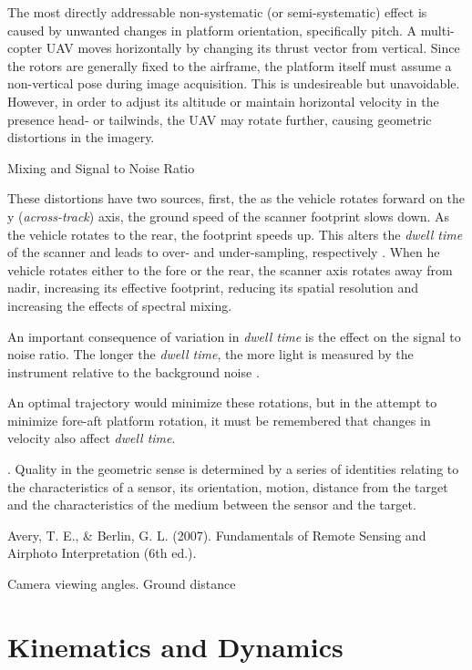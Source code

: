 \documentclass[10pt]{article}
\begin{document}
The most directly addressable non-systematic (or semi-systematic) effect is caused by unwanted changes in platform orientation, specifically pitch. A multi-copter UAV moves horizontally by changing its thrust vector from vertical. Since the rotors are generally fixed to the airframe, the platform itself must assume a non-vertical pose during image acquisition. This is undesireable but unavoidable. However, in order to adjust its altitude or maintain horizontal velocity in the presence head- or tailwinds, the UAV may rotate further, causing geometric distortions in the imagery. 

Mixing and Signal to Noise Ratio

These distortions have two sources, first, the as the vehicle rotates forward on the y (\emph{across-track}) axis, the ground speed of the scanner footprint slows down. As the vehicle rotates to the rear, the footprint speeds up. This alters the \emph{dwell time} of the scanner and leads to over- and under-sampling, respectively \cite{Gupta2018}. When he vehicle rotates either to the fore or the rear, the scanner axis rotates away from nadir, increasing its effective footprint, reducing its spatial resolution \cite{Gupta2018} and increasing the effects of spectral mixing. 

An important consequence of variation in \emph{dwell time} is the effect on the signal to noise ratio. The longer the \emph{dwell time}, the more light is measured by the instrument relative to the background noise \cite{Rogass2014}.

An optimal trajectory would minimize these rotations, but in the attempt to minimize fore-aft platform rotation, it must be remembered that changes in velocity also affect \emph{dwell time}.




 \cite{Gupta2018}. 
Quality in the geometric sense is determined by a series of identities relating to the characteristics of a sensor, its orientation, motion, distance from the target and the characteristics of the medium between the sensor and the target.

\cite{Avery2007}
Avery, T. E., \& Berlin, G. L. (2007). Fundamentals of Remote Sensing and Airphoto Interpretation (6th ed.).

Camera viewing angles.
Ground distance


\section{Kinematics and Dynamics}
\end{document}
